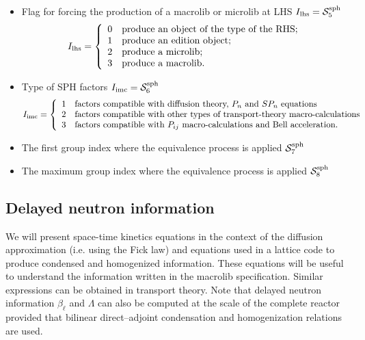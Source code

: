 \begin{itemize}
\item Flag for forcing the production of a macrolib or microlib at LHS $I_{\rm lhs} = \mathcal{S}^{\rm sph}_{5}$
\begin{displaymath}
I_{\rm lhs} = \left\{
\begin{array}{ll}
0 & \textrm{produce an object of the type of the RHS;} \\
1 & \textrm{produce an edition object;} \\
2 & \textrm{produce a microlib;} \\
3 & \textrm{produce a macrolib.}
\end{array} \right.
\end{displaymath}

\item Type of SPH factors $I_{\rm imc} = \mathcal{S}^{\rm sph}_{6}$
\begin{displaymath}
I_{\rm imc} = \left\{
\begin{array}{ll}
1 & \textrm{factors compatible with diffusion theory, $P_n$ and $SP_n$ equations} \\
2 & \textrm{factors compatible with other types of transport-theory macro-calculations} \\
3 & \textrm{factors compatible with $P_{ij}$ macro-calculations and Bell acceleration.} \\
\end{array} \right.
\end{displaymath}

\item The first group index where the equivalence process is applied $\mathcal{S}^{\rm sph}_{7}$ 

\item The maximum group index where the equivalence process is applied $\mathcal{S}^{\rm sph}_{8}$ 

\end{itemize}

\subsection{Delayed neutron information}

We will present space-time kinetics equations in the context of the diffusion
approximation (i.e. using the Fick law) and equations used in a lattice code
to produce condensed and homogenized information. These equations will be useful to understand the
information written in the {\sc macrolib} specification. Similar expressions can
be obtained in transport theory. Note that delayed neutron information
$\beta_\ell$ and $\Lambda$ can also be computed at the scale of the complete reactor
provided that bilinear direct--adjoint condensation and homogenization relations
are used.

